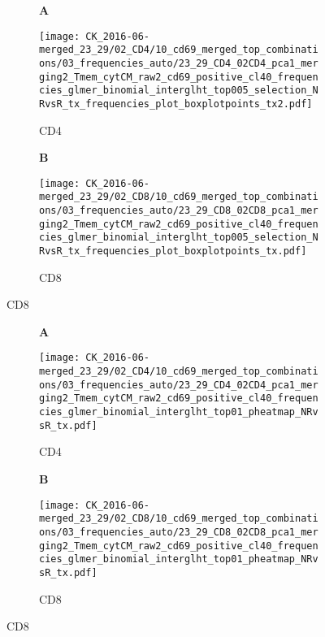 \documentclass[a4paper, 12pt]{article}
\begin{document}
\begin{figure}[!thb]
\centering
    
    \caption{}
    \begin{subfigure}[t]{0.02\textwidth}
    \vskip 0pt
        \textbf{\textsf{\normalsize A}}
    \end{subfigure}
    \begin{subfigure}[t]{0.45\textwidth}
    \vskip 0pt
    \caption{CD4}
        \texttt{[image: CK\_2016-06-merged\_23\_29/02\_CD4/10\_cd69\_merged\_top\_combinations/03\_frequencies\_auto/23\_29\_CD4\_02CD4\_pca1\_merging2\_Tmem\_cytCM\_raw2\_cd69\_positive\_cl40\_frequencies\_glmer\_binomial\_interglht\_top005\_selection\_NRvsR\_tx\_frequencies\_plot\_boxplotpoints\_tx2.pdf]}
    \end{subfigure}
\quad
    \begin{subfigure}[t]{0.02\textwidth}
    \vskip 0pt
        \textbf{\textsf{\normalsize B}}
    \end{subfigure}
    \begin{subfigure}[t]{0.45\textwidth}
    \vskip 0pt
    \caption{CD8}
        \texttt{[image: CK\_2016-06-merged\_23\_29/02\_CD8/10\_cd69\_merged\_top\_combinations/03\_frequencies\_auto/23\_29\_CD8\_02CD8\_pca1\_merging2\_Tmem\_cytCM\_raw2\_cd69\_positive\_cl40\_frequencies\_glmer\_binomial\_interglht\_top005\_selection\_NRvsR\_tx\_frequencies\_plot\_boxplotpoints\_tx.pdf]}
    \end{subfigure}
    
\end{figure}


\clearpage


\begin{figure}[!thb]
\centering
    
    \caption{Significant cytokine combinations for TX p-value $<$ 0.1}
    \begin{subfigure}[t]{0.02\textwidth}
    \vskip 0pt
        \textbf{\textsf{\normalsize A}}
    \end{subfigure}
    \begin{subfigure}[t]{0.45\textwidth}
    \vskip 0pt
    \caption{CD4}
        \texttt{[image: CK\_2016-06-merged\_23\_29/02\_CD4/10\_cd69\_merged\_top\_combinations/03\_frequencies\_auto/23\_29\_CD4\_02CD4\_pca1\_merging2\_Tmem\_cytCM\_raw2\_cd69\_positive\_cl40\_frequencies\_glmer\_binomial\_interglht\_top01\_pheatmap\_NRvsR\_tx.pdf]}
    \end{subfigure}
\quad
    \begin{subfigure}[t]{0.02\textwidth}
    \vskip 0pt
        \textbf{\textsf{\normalsize B}}
    \end{subfigure}
    \begin{subfigure}[t]{0.45\textwidth}
    \vskip 0pt
    \caption{CD8}
        \texttt{[image: CK\_2016-06-merged\_23\_29/02\_CD8/10\_cd69\_merged\_top\_combinations/03\_frequencies\_auto/23\_29\_CD8\_02CD8\_pca1\_merging2\_Tmem\_cytCM\_raw2\_cd69\_positive\_cl40\_frequencies\_glmer\_binomial\_interglht\_top01\_pheatmap\_NRvsR\_tx.pdf]}
    \end{subfigure}
    
    
\end{figure}
\end{document}
